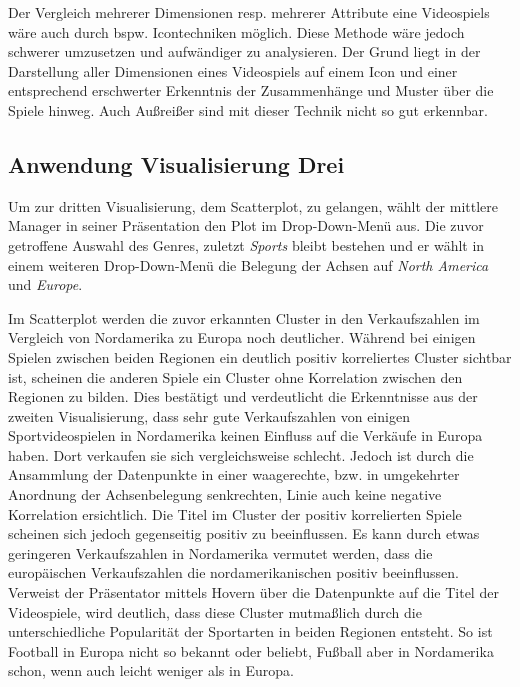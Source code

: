 \documentclass[usegeometry=true]{scrartcl}
\begin{document}
Der Vergleich mehrerer Dimensionen resp. mehrerer Attribute eine Videospiels wäre auch durch bspw. Icontechniken möglich. Diese Methode wäre jedoch schwerer umzusetzen und aufwändiger zu analysieren. 
Der Grund liegt in der Darstellung aller Dimensionen eines Videospiels auf einem Icon und einer entsprechend erschwerter Erkenntnis der Zusammenhänge und Muster über die Spiele hinweg. 
Auch Außreißer sind mit dieser Technik nicht so gut erkennbar.

\subsection{Anwendung Visualisierung Drei}
Um zur dritten Visualisierung, dem Scatterplot, zu gelangen, wählt der mittlere Manager in seiner Präsentation den Plot im Drop-Down-Menü aus.
Die zuvor getroffene Auswahl des Genres, zuletzt \textit{Sports} bleibt bestehen und er wählt in einem weiteren Drop-Down-Menü die Belegung der Achsen auf \textit{North America} und \textit{Europe}.

Im Scatterplot werden die zuvor erkannten Cluster in den Verkaufszahlen im Vergleich von Nordamerika zu Europa noch deutlicher. 
Während bei einigen Spielen zwischen beiden Regionen ein deutlich positiv korreliertes Cluster sichtbar ist, scheinen die anderen Spiele ein Cluster ohne Korrelation zwischen den Regionen zu bilden.
Dies bestätigt und verdeutlicht die Erkenntnisse aus der zweiten Visualisierung, dass sehr gute Verkaufszahlen von einigen Sportvideospielen in Nordamerika keinen Einfluss auf die Verkäufe in Europa haben. 
Dort verkaufen sie sich vergleichsweise schlecht. Jedoch ist durch die Ansammlung der Datenpunkte in einer waagerechte, bzw. in umgekehrter Anordnung der Achsenbelegung senkrechten, Linie auch keine negative Korrelation ersichtlich.
Die Titel im Cluster der positiv korrelierten Spiele scheinen sich jedoch gegenseitig positiv zu beeinflussen. Es kann durch etwas geringeren Verkaufszahlen in Nordamerika vermutet werden, dass die europäischen Verkaufszahlen die nordamerikanischen positiv beeinflussen. 
Verweist der Präsentator mittels Hovern über die Datenpunkte auf die Titel der Videospiele, wird deutlich, dass diese Cluster mutmaßlich durch die unterschiedliche Popularität der Sportarten in beiden Regionen entsteht. 
So ist Football in Europa nicht so bekannt oder beliebt, Fußball aber in Nordamerika schon, wenn auch leicht weniger als in Europa.
\end{document}
